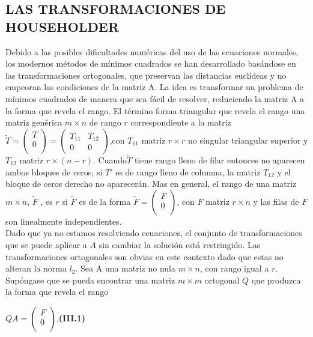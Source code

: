 \documentclass[twocolumn,twoside]{article}
\begin{document}
\subsection{LAS TRANSFORMACIONES DE HOUSEHOLDER}
Debido a las posibles dificultades num\'ericas del uso de las ecuaciones normales, los
modernos m\'etodos de m\'inimos cuadrados se han desarrollado bas\'andose en las transformaciones 
ortogonales, que preservan las distancias eucl\'ideas y no empeoran las
condiciones de la matriz A. La idea es transformar un problema de m\'inimos cuadrados
de manera que sea f\'acil de resolver, reduciendo la matriz A a la forma que revela el rango.
El t\'ermino forma triangular que revela el rango una matriz gen\'erica $m\times n$ de rango $r$
correspondiente a la matriz $ \tilde T = 
\left(\begin{array}{c}
  T\\ 
  0\\
 \end{array}\right)=
 \left(\begin{array}{cc}
  T_{11} & T_{12} \\ 
  0     &   0
 \end{array}\right)
$,con $T_{11}$ matriz $r\times r$ no singular triangular superior y $T_{12}$ matriz $r\times (n-r)$.
Cuando$ \tilde T $ tiene rango lleno de filar entonces no aparecen ambos bloques de ceros; si $T'$ 
es de rango lleno de columna, la matriz $T_{12}$ y el bloque de ceros derecho no aparecer\'an. 
Mas en general, el rango de una 
matriz $m\times n$, $\tilde F$ , es $r$ si $\tilde F$ es de la forma $\tilde F =
\left(\begin{array}{c}
  F\\ 
  0\\
 \end{array}\right)$, con $F$ matriz $r\times n$ y las filas de $F$ son linealmente independientes.\\
Dado que ya no estamos resolviendo ecuaciones, el conjunto de transformaciones
que se puede aplicar a $A$ sin cambiar la soluci\'on est\'a restringido. Las transformaciones
ortogonales son obvias en este contexto dado que estas no alteran la norma $l_{2}$.
Sea A una matriz no nula $m\times n$, con rango igual a $r$. Sup\'ongase que se pueda
encontrar una matriz $m\times m$ ortogonal $Q$ que produzca la forma que revela el rango
\begin{center}
  $Q A =\left(\begin{array}{c}
    F\\ 
    0\\
   \end{array}\right)$,\hspace{2cm}\textbf{(III.1)}
\end{center}
\end{document}
